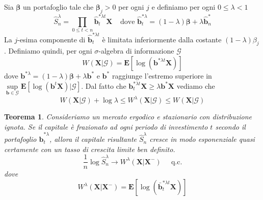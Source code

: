 \documentclass[a4paper,11pt]{book}
\theoremstyle{plain}
\newtheorem{teo}{Teorema}[chapter]
\theoremstyle{definition}
\theoremstyle{remark}
\newcommand{\X}{\bm{X}}
\newcommand{\B}{\bm{b}}
\newcommand{\E}{\mathbf{E}}
\newcommand{\bh}{\hat{\bm{b}}}
\newcommand{\Sh}{\hat{S}}
\begin{document}
Sia $\bm{\beta}$ un portafoglio tale che $\bm{\beta}_j>0$ per ogni $j$ e definiamo per ogni $0\leq \lambda <1$ 
\begin{equation*}
	\Sh^\lambda_n = \prod_{0\leq t <n}{\bh^{*\lambda t}_t\X} \;\;\;\; \text{dove  } \bh^{*\lambda}_t = (1-\lambda)\bm{\beta}+\lambda \bh^{*}_n
\end{equation*}
La $j$-esima componente di $\bh^{*\lambda t}_t$ è limitata inferiormente dalla costante $(1-\lambda)\beta_j$. Definiamo quindi, per ogni $\sigma$-algebra di informazione $\mathcal{G}$
\begin{equation*}
	W(\X|\mathcal{G}) = \E[\log(\B^{*\lambda t}\X)]
\end{equation*}
dove $\B^{*\lambda} = (1-\lambda)\bm{\beta}+\lambda \B^*$ e $\B^*$ raggiunge l'estremo superiore in $\sup\limits_{\B\in \mathcal{G}}\E[\log(\B^t\X)|\mathcal{G}]$. Dal fatto che $\B^{*\lambda t}_t\X\geq \lambda \B^*\X$ vediamo che
\begin{equation*}
	W(\X|\mathcal{G})+\log\lambda\leq W^\lambda(\X|\mathcal{G})\leq W(\X|\mathcal{G})
\end{equation*}
\begin{teo}\label{teo:erg-notsafe}
	Consideriamo un mercato ergodico e stazionario con distribuzione ignota. Se il capitale è frazionato ad ogni periodo di investimento $t$ secondo il portafoglio $\bh^{*\lambda}_t$, allora il capitale risultante $\Sh^\lambda_n$ cresce in modo esponenziale quasi certamente con un tasso di crescita limite ben definito.
	\begin{equation*}
		\frac{1}{n}\log\Sh^\lambda_n \rightarrow W^\lambda(\X|\X^{-}) \;\;\;\;\; \text{q.c.}
	\end{equation*}
	dove
	\begin{equation*}
		W^\lambda(\X|\X^-) =\E[\log(\bar{\B}^{*\lambda t}_t\X)]
	\end{equation*}
\end{teo}
\end{document}

